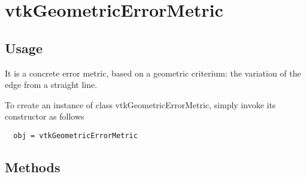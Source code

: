 \section{vtkGeometricErrorMetric}

\subsection{Usage}

 It is a concrete error metric, based on a geometric criterium:
 the variation of the edge from a straight line.


To create an instance of class vtkGeometricErrorMetric, simply
invoke its constructor as follows
\begin{verbatim}
  obj = vtkGeometricErrorMetric
\end{verbatim}
\subsection{Methods}


